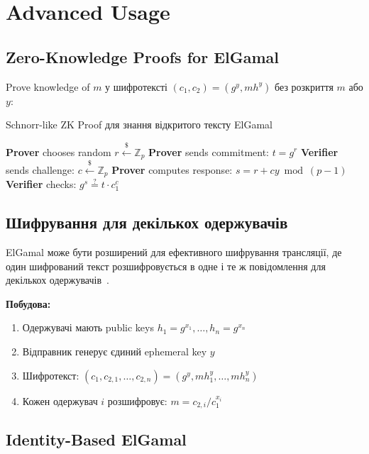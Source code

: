 \section{Advanced Usage}

\subsection{Zero-Knowledge Proofs for ElGamal}

Prove knowledge of $m$ у шифротексті $(c_1, c_2) = (g^y, m h^y)$ без розкриття $m$ або $y$:

\begin{algorithm}
    \caption{Schnorr-like ZK Proof для знання відкритого тексту ElGamal}
    \begin{algorithmic}[1]
        \State \textbf{Prover} chooses random $r \xleftarrow{\$} \mathbb{Z}_p$
        \State \textbf{Prover} sends commitment: $t = g^r$
        \State \textbf{Verifier} sends challenge: $c \xleftarrow{\$} \mathbb{Z}_p$
        \State \textbf{Prover} computes response: $s = r + cy \bmod (p-1)$
        \State \textbf{Verifier} checks: $g^s \stackrel{?}{=} t \cdot c_1^c$
    \end{algorithmic}
\end{algorithm}

\subsection{Шифрування для декількох одержувачів}

ElGamal може бути розширений для ефективного шифрування трансляції, де один шифрований текст розшифровується в 
одне і те ж повідомлення для декількох одержувачів~\cite{bellare2000multi}.

\textbf{Побудова:}
\begin{enumerate}
    \item Одержувачі мають public keys $h_1 = g^{x_1}, \ldots, h_n = g^{x_n}$
    \item Відправник генерує єдиний ephemeral key $y$
    \item Шифротекст: $(c_1, c_{2,1}, \ldots, c_{2,n}) = (g^y, m h_1^y, \ldots, m h_n^y)$
    \item Кожен одержувач $i$ розшифровує: $m = c_{2,i} / c_1^{x_i}$
\end{enumerate}

\subsection{Identity-Based ElGamal}

